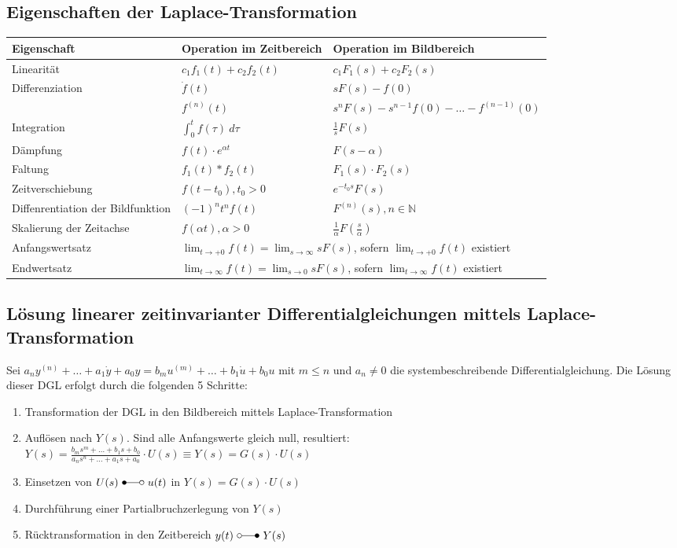 \documentclass[10pt,a4paper]{article}
\begin{document}
\subsection{Eigenschaften der Laplace-Transformation}
\begin{tabularx}{\columnwidth}{|X|X|X|}
	\hline
	Eigenschaft & Operation im Zeitbereich & Operation im Bildbereich \\
	\hline
	\hline
	Linearität & $c_1f_1(t) + c_2f_2(t)$ & $c_1 F_1(s) + c_2 F_2(s)$ \\
	\hline
	Differenziation & $\dot f(t)$ & $sF(s) - f(0)$ \\
	& $f^{(n)}(t)$ & $s^n F(s) - s^{n - 1} f(0) - \dots - f^{(n-1)}(0)$ \\
	\hline
	Integration & $\int_0^t f(\tau) ~d\tau$ & $\frac 1 s F(s)$ \\
	\hline
	Dämpfung & $f(t) ⋅ e^{\alpha t}$ & $F(s-\alpha)$ \\
	\hline
	Faltung & $f_1(t) * f_2(t)$ & $F_1(s) ⋅ F_2(s)$ \\
	\hline
	Zeitverschiebung & $f(t - t_0), t_0 > 0$ & $e^{-t_0 s}F(s)$ \\
	\hline
	Diffenrentiation der Bildfunktion & $(-1)^n t^n f(t)$ & $F^{(n)}(s), n \in \mathbb{N}$ \\
	\hline
	Skalierung der Zeitachse & $f(\alpha t), \alpha > 0$ & $\frac 1 \alpha F(\frac s \alpha)$ \\
	\hline
	Anfangswertsatz & \multicolumn{2}{X|}{$\lim_{t → +0} f(t) = \lim_{s → ∞} s F(s)$, sofern $\lim_{t → +0} f(t)$ existiert} \\
	\hline
	Endwertsatz & \multicolumn{2}{X|}{$\lim_{t → ∞} f(t) = \lim_{s → 0} sF(s)$, sofern $\lim_{t → ∞} f(t)$ existiert} \\
	\hline
\end{tabularx}

\subsection{Lösung linearer zeitinvarianter Differentialgleichungen mittels Laplace-Transformation}
Sei $a_ny^{(n)} + \dots + a_1 \dot y + a_0 y = b_m u^{(m)} + \dots + b_1 \dot u + b_0 u$ mit $m ≤ n$ und $a_n ≠ 0$ die systembeschreibende Differentialgleichung.
Die Lösung dieser DGL erfolgt durch die folgenden 5 Schritte:
\begin{enumerate}
	\item Transformation der DGL in den Bildbereich mittels Laplace-Transformation
	\item Auflösen nach $Y(s)$. Sind alle Anfangswerte gleich null, resultiert: \\
	$Y(s) = \frac{b_ms^m + \dots + b_1s + b_0}{a_ns^n + \dots + a_1s + a_0} ⋅ U(s) ≡ Y(s) = G(s) ⋅ U(s)$
	\item Einsetzen von $U(s) ~\Laplace ~u(t)$ in $Y(s) = G(s) ⋅ U(s)$
	\item Durchführung einer Partialbruchzerlegung von $Y(s)$
	\item Rücktransformation in den Zeitbereich $y(t) ~\laplace ~Y(s)$
\end{enumerate}
\end{document}
